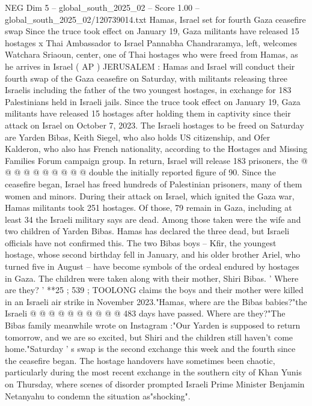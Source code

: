 \begin{textsample}{NEG Dim 5 – global\_south\_2025\_02 – Score 1.00 – global\_south\_2025\_02/120739014.txt}  \label{ex:f5_neg_304}
Hamas, Israel set for fourth Gaza ceasefire swap Since the truce took effect on January 19, Gaza militants have released 15 hostages x Thai Ambassador to Israel Pannabha Chandraramya, left, welcomes Watchara Sriaoun, center, one of Thai hostages who were freed from Hamas, as he arrives in Israel ( AP ) JERUSALEM : Hamas and Israel will conduct their fourth swap of the Gaza ceasefire on Saturday, with militants releasing three Israelis including the father of the two youngest hostages, in exchange for 183 Palestinians held in Israeli jails.
Since the truce took effect on January 19, Gaza militants have released 15 hostages after holding them in captivity since their attack on Israel on October 7, 2023.
The Israeli hostages to be freed on Saturday are Yarden Bibas, Keith Siegel, who also holds US citizenship, and Ofer Kalderon, who also has French nationality, according to the Hostages and Missing Families Forum campaign group.
In return, Israel will release 183 prisoners, the @ @ @ @ @ @ @ @ @ @ double the initially reported figure of 90.
Since the ceasefire began, Israel has freed hundreds of Palestinian prisoners, many of them women and minors.
During their attack on Israel, which ignited the Gaza war, Hamas militants took 251 hostages.
Of those, 79 remain in Gaza, including at least 34 the Israeli military says are dead.
Among those taken were the wife and two children of Yarden Bibas.
Hamas has declared the three dead, but Israeli officials have not confirmed this.
The two Bibas boys -- Kfir, the youngest hostage, whose second birthday fell in January, and his older brother Ariel, who turned five in August -- have become symbols of the ordeal endured by hostages in Gaza.
The children were taken along with their mother, Shiri Bibas. ' Where are they? ' **25 ; 539 ; TOOLONG claims the boys and their mother were killed in an Israeli air strike in November 2023."Hamas, where are the Bibas babies?"the Israeli @ @ @ @ @ @ @ @ @ @ 483 days have passed.
Where are they?"The Bibas family meanwhile wrote on Instagram :"Our Yarden is supposed to return tomorrow, and we are so excited, but Shiri and the children still haven't come home."Saturday ' s swap is the second exchange this week and the fourth since the ceasefire began.
The hostage handovers have sometimes been chaotic, particularly during the most recent exchange in the southern city of Khan Yunis on Thursday, where scenes of disorder prompted Israeli Prime Minister Benjamin Netanyahu to condemn the situation as"shocking".

\end{textsample}
